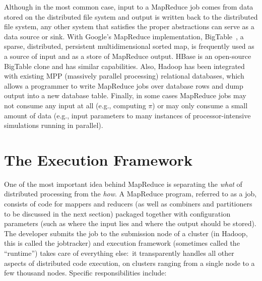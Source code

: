 Although in the most common case, input to a MapReduce job comes from
data stored on the distributed file system and output is written back
to the distributed file system, any other system that satisfies the
proper abstractions can serve as a data source or sink.  With Google's
MapReduce implementation, BigTable~\cite{ChangFay_etal_OSDI2006}, a
sparse, distributed, persistent multidimensional sorted map, is
frequently used as a source of input and as a store of MapReduce
output.  HBase is an open-source BigTable clone and has similar
capabilities.  Also, Hadoop has been integrated with existing MPP
(massively parallel processing) relational databases, which allows a
programmer to write MapReduce jobs over database rows and dump output
into a new database table.  Finally, in some cases MapReduce jobs may
not consume any input at all (e.g., computing $\pi$) or may only
consume a small amount of data (e.g., input parameters to many
instances of processor-intensive simulations running in parallel).

\section{The Execution Framework}
\label{chapter2:execution-framework}

One of the most important idea behind MapReduce is separating the \emph{
what} of distributed processing from the \emph{how}.  A MapReduce
program, referred to as a job, consists of code for mappers and
reducers (as well as combiners and partitioners to be discussed in the
next section) packaged together with configuration parameters (such as
where the input lies and where the output should be stored).  The
developer submits the job to the submission node of a cluster (in
Hadoop, this is called the jobtracker) and execution framework
(sometimes called the ``runtime'') takes care of everything else:\ it
transparently handles all other aspects of distributed code execution,
on clusters ranging from a single node to a few thousand nodes.
Specific responsibilities include:

